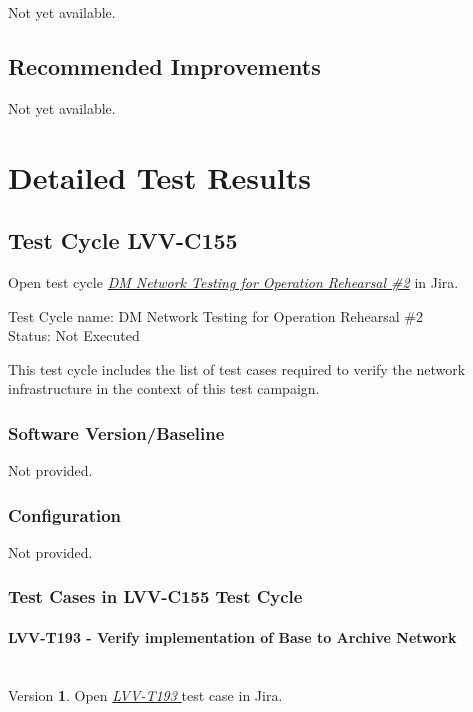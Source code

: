 \documentclass[DM,lsstdraft,STR,toc]{lsstdoc}
\begin{document}
Not yet available.

\subsection{Recommended Improvements}
\label{sect:recommendations}

Not yet available.

\newpage
\section{Detailed Test Results}
\label{sect:detailedtestresults}

\subsection{Test Cycle LVV-C155 }

Open test cycle {\it \href{https://jira.lsstcorp.org/secure/Tests.jspa#/testrun/LVV-C155}{DM Network Testing for Operation Rehearsal \#2}} in Jira.

Test Cycle name: DM Network Testing for Operation Rehearsal \#2\\
Status: Not Executed

This test cycle includes the list of test cases required to verify the
network infrastructure in the context of this test campaign.

\subsubsection{Software Version/Baseline}
Not provided.

\subsubsection{Configuration}
Not provided.

\subsubsection{Test Cases in LVV-C155 Test Cycle}

\paragraph{ LVV-T193 - Verify implementation of Base to Archive Network }\mbox{}\\

Version \textbf{1}.
Open  \href{https://jira.lsstcorp.org/secure/Tests.jspa#/testCase/LVV-T193}{\textit{ LVV-T193 } }
test case in Jira.
\end{document}

